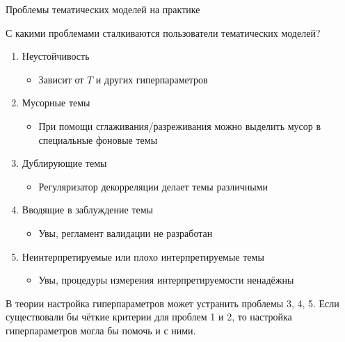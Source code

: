 \begin{frame}[t]{Проблемы тематических моделей на практике}

С какими проблемами сталкиваются пользователи тематических моделей?
\begin{enumerate}
    \item{ Неустойчивость \begin{itemize}
        \item {Зависит от $T$ и других гиперпараметров}
    \end{itemize}}
    \item{ Мусорные темы \begin{itemize}
        \item {При помощи сглаживания/разреживания можно выделить мусор в специальные фоновые темы}
    \end{itemize}}
    \item{ Дублирующие темы \begin{itemize}
        \item {Регуляризатор декорреляции делает темы различными}
    \end{itemize}}
    \item{ Вводящие в заблуждение темы \begin{itemize}
        \item {Увы, регламент валидации не разработан}
    \end{itemize}}
    \item{ Неинтерпретируемые или плохо интерпретируемые темы \begin{itemize}
        \item {Увы, процедуры измерения интерпретируемости ненадёжны}
    \end{itemize}}
\end{enumerate}
В теории настройка гиперпараметров может устранить проблемы 3, 4, 5. Если существовали бы чёткие критерии для проблем 1 и 2,  то настройка гиперпараметров могла бы помочь и с ними.
\end{frame}

